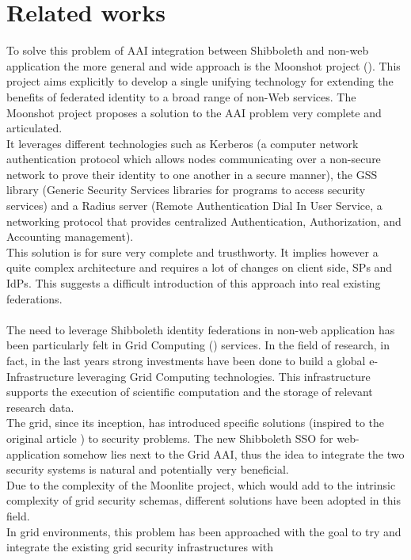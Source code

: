 \section{Related works}
To solve this problem of AAI integration between Shibboleth and non-web application the more general and wide approach is the Moonshot
project (\cite{Howlett-2010}).
This project aims explicitly to develop a single unifying technology for extending the benefits of federated identity to a broad range of
non-Web services.
The Moonshot project proposes a solution to the AAI problem very complete and articulated.\\
It leverages different technologies such as Kerberos (a computer network authentication protocol which allows nodes communicating over a
non-secure network to prove their identity to one another in a secure manner), the GSS library (Generic Security Services libraries for
programs to access security services) and a Radius server (Remote Authentication Dial In User Service, a networking protocol that provides
centralized Authentication, Authorization, and Accounting management).\\
This solution is for sure very complete and trusthworty.
It implies however a quite complex architecture and requires a lot of changes on client side, SPs and IdPs.
This suggests a difficult introduction of this approach into real existing federations.\\
\\
The need to leverage Shibboleth identity federations in non-web application has been particularly felt in Grid Computing
(\cite{Kesselman-1998}) services.
In the field of research, in fact, in the last years strong investments have been done to build a global e-Infrastructure leveraging Grid
Computing technologies.
This infrastructure supports the execution of scientific computation and the storage of relevant research data.\\
The grid, since its inception, has introduced specific solutions (inspired to the original article \cite{Foster-1998}) to security problems.
The new Shibboleth SSO for web-application somehow lies next to the Grid AAI, thus the idea to integrate the two security systems is natural
and potentially very beneficial.\\
Due to the complexity of the Moonlite project, which would add to the intrinsic complexity of grid security schemas, different solutions have
been adopted in this field.
\\
In grid environments, this problem has been approached with the goal to try and integrate the existing grid security infrastructures with
